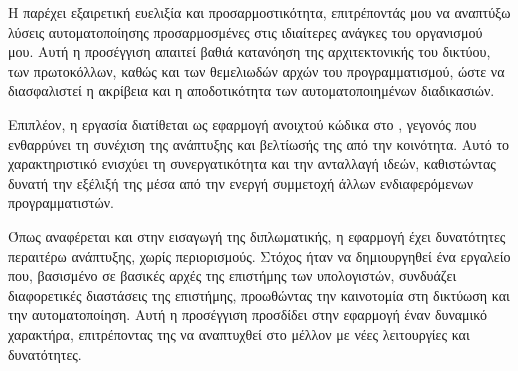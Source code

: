Η  παρέχει εξαιρετική ευελιξία και προσαρμοστικότητα, επιτρέποντάς μου να αναπτύξω λύσεις αυτοματοποίησης προσαρμοσμένες στις ιδιαίτερες 
ανάγκες του οργανισμού μου. Αυτή η προσέγγιση απαιτεί βαθιά κατανόηση της αρχιτεκτονικής του δικτύου, των πρωτοκόλλων, καθώς και των θεμελιωδών αρχών του προγραμματισμού, 
ώστε να διασφαλιστεί η ακρίβεια και η αποδοτικότητα των αυτοματοποιημένων διαδικασιών.

Επιπλέον, η εργασία διατίθεται ως εφαρμογή ανοιχτού κώδικα στο , γεγονός που ενθαρρύνει τη συνέχιση της ανάπτυξης και βελτίωσής της από την κοινότητα. 
Αυτό το χαρακτηριστικό ενισχύει τη συνεργατικότητα και την ανταλλαγή ιδεών, καθιστώντας δυνατή την εξέλιξή της μέσα από την ενεργή συμμετοχή άλλων ενδιαφερόμενων προγραμματιστών.

Όπως αναφέρεται και στην εισαγωγή της διπλωματικής, η εφαρμογή έχει δυνατότητες περαιτέρω ανάπτυξης, χωρίς περιορισμούς. 
Στόχος ήταν να δημιουργηθεί ένα εργαλείο που, βασισμένο σε βασικές αρχές της επιστήμης των υπολογιστών, συνδυάζει διαφορετικές διαστάσεις της επιστήμης, 
προωθώντας την καινοτομία στη δικτύωση και την αυτοματοποίηση. Αυτή η προσέγγιση προσδίδει στην εφαρμογή έναν δυναμικό χαρακτήρα, επιτρέποντας της να αναπτυχθεί στο μέλλον 
με νέες λειτουργίες και δυνατότητες. 

